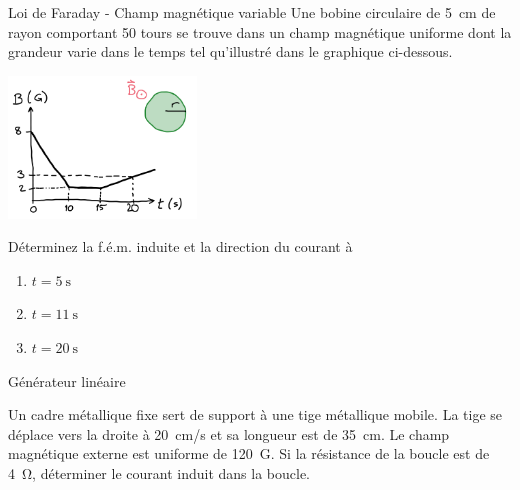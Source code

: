 \documentclass{beamer}
\begin{document}
\begin{frame}[t]{Loi de Faraday - Champ magnétique variable}
  Une bobine circulaire de \SI{5}{\centi\meter} de rayon comportant \num{50}
  tours se trouve dans un champ magnétique uniforme dont la grandeur varie dans
  le temps tel qu'illustré dans le graphique ci-dessous.
  \begin{center}
    \includegraphics[width=5cm]{figures/champ_variable.png}
  \end{center}

  Déterminez la f.é.m. induite et la direction du courant à
  \begin{enumerate}
    \item $t = \SI{5}{\second}$
    \item $t = \SI{11}{\second}$
    \item $t = \SI{20}{\second}$
  \end{enumerate}
\end{frame}


\begin{frame}[t]{Générateur linéaire}

  Un cadre métallique fixe sert de support à une tige métallique mobile. La tige
  se déplace vers la droite à \SI{20}{cm/s} et sa longueur est de \SI{35}{cm}. Le
  champ magnétique externe est uniforme de \SI{120}{G}.
  Si la résistance de la boucle est de \SI{4}{\ohm}, déterminer le courant induit
  dans la boucle.

  \begin{center}
  \end{center}
\end{frame}
\end{document}
